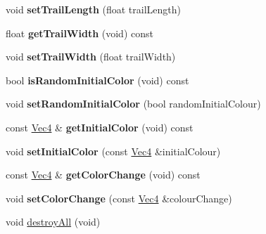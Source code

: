 \begin{DoxyCompactItemize}
\mbox{\label{classPURibbonTrailRender_a92ce4592f99d7429c774dde21682ffac}} 
void {\bfseries set\+Trail\+Length} (float trail\+Length)
\item 
\mbox{\label{classPURibbonTrailRender_a001b396c4f964a31912d315f159a551d}} 
float {\bfseries get\+Trail\+Width} (void) const
\item 
\mbox{\label{classPURibbonTrailRender_a8cf9b2e330d3ad341c123bb0227bfd07}} 
void {\bfseries set\+Trail\+Width} (float trail\+Width)
\item 
\mbox{\label{classPURibbonTrailRender_a55ef0d1c86d44d02169dbbe304e8270a}} 
bool {\bfseries is\+Random\+Initial\+Color} (void) const
\item 
\mbox{\label{classPURibbonTrailRender_a25e825a8ab5e5521bbfbbd7ca1b62cd3}} 
void {\bfseries set\+Random\+Initial\+Color} (bool random\+Initial\+Colour)
\item 
\mbox{\label{classPURibbonTrailRender_abd4844debdcfb30c373852c59eb7bd6b}} 
const \hyperlink{classVec4}{Vec4} \& {\bfseries get\+Initial\+Color} (void) const
\item 
\mbox{\label{classPURibbonTrailRender_a8d85187195bf24bf5a46efad2b8f0a0a}} 
void {\bfseries set\+Initial\+Color} (const \hyperlink{classVec4}{Vec4} \&initial\+Colour)
\item 
\mbox{\label{classPURibbonTrailRender_a3dd99783f15c1c0569da8a10e576ae04}} 
const \hyperlink{classVec4}{Vec4} \& {\bfseries get\+Color\+Change} (void) const
\item 
\mbox{\label{classPURibbonTrailRender_a205e2b12e49c1c0a950065ac45d54ff8}} 
void {\bfseries set\+Color\+Change} (const \hyperlink{classVec4}{Vec4} \&colour\+Change)
\item 
void \hyperlink{classPURibbonTrailRender_a98f209e22dc55676e0b01c609e2b5262}{destroy\+All} (void)
\item 
\mbox{\label{classPURibbonTrailRender_a799f5bf596b8a0c14a4ef17b7cdea788}} 

\end{DoxyCompactItemize}
